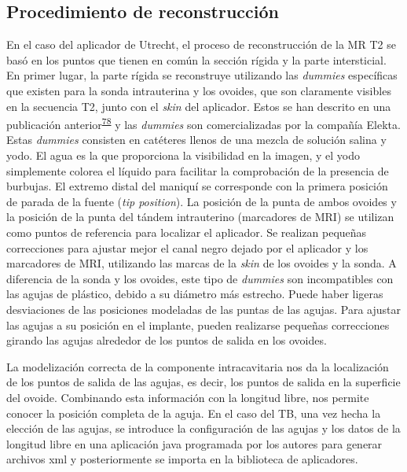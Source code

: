 \documentclass[
  a4paper,
]{scrreprt}
\begin{document}
\hypertarget{sec-MM-reconstruction}{%
\subsection{Procedimiento de
reconstrucción}\label{sec-MM-reconstruction}}

En el caso del aplicador de Utrecht, el proceso de reconstrucción de la
MR T2 se basó en los puntos que tienen en común la sección rígida y la
parte intersticial. En primer lugar, la parte rígida se reconstruye
utilizando las \emph{dummies} específicas que existen para la sonda
intrauterina y los ovoides, que son claramente visibles en la secuencia
T2, junto con el \emph{skin} del aplicador. Estos se han descrito en una
publicación
anterior\textsuperscript{\protect\hyperlink{ref-perez-calatayud2009}{78}}
y las \emph{dummies} son comercializadas por la compañía Elekta. Estas
\emph{dummies} consisten en catéteres llenos de una mezcla de solución
salina y yodo. El agua es la que proporciona la visibilidad en la
imagen, y el yodo simplemente colorea el líquido para facilitar la
comprobación de la presencia de burbujas. El extremo distal del maniquí
se corresponde con la primera posición de parada de la fuente (\emph{tip
position}). La posición de la punta de ambos ovoides y la posición de la
punta del tándem intrauterino (marcadores de MRI) se utilizan como
puntos de referencia para localizar el aplicador. Se realizan pequeñas
correcciones para ajustar mejor el canal negro dejado por el aplicador y
los marcadores de MRI, utilizando las marcas de la \emph{skin} de los
ovoides y la sonda. A diferencia de la sonda y los ovoides, este tipo de
\emph{dummies} son incompatibles con las agujas de plástico, debido a su
diámetro más estrecho. Puede haber ligeras desviaciones de las
posiciones modeladas de las puntas de las agujas. Para ajustar las
agujas a su posición en el implante, pueden realizarse pequeñas
correcciones girando las agujas alrededor de los puntos de salida en los
ovoides.

La modelización correcta de la componente intracavitaria nos da la
localización de los puntos de salida de las agujas, es decir, los puntos
de salida en la superficie del ovoide. Combinando esta información con
la longitud libre, nos permite conocer la posición completa de la aguja.
En el caso del TB, una vez hecha la elección de las agujas, se introduce
la configuración de las agujas y los datos de la longitud libre en una
aplicación java programada por los autores para generar archivos xml y
posteriormente se importa en la biblioteca de aplicadores.
\end{document}

